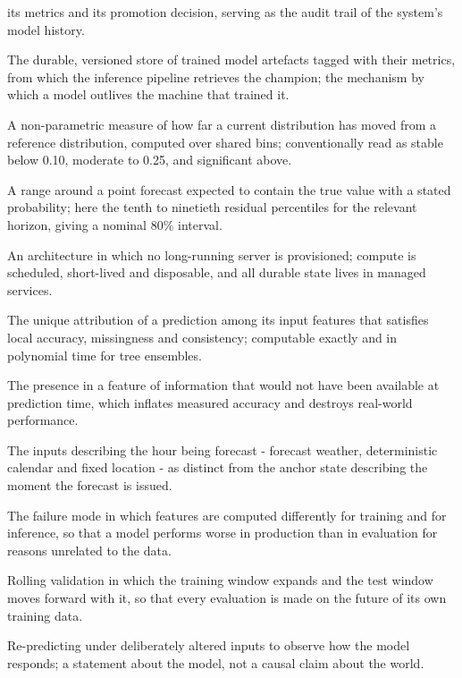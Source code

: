 \begin{description}[style=nextline,leftmargin=1.5em,labelsep=0pt,itemsep=5pt]
  its metrics and its promotion decision, serving as the audit trail of the
  system's model history.
  \item[Model registry] The durable, versioned store of trained model artefacts
  tagged with their metrics, from which the inference pipeline retrieves the
  champion; the mechanism by which a model outlives the machine that trained it.
  \item[Population Stability Index] A non-parametric measure of how far a current
  distribution has moved from a reference distribution, computed over shared bins;
  conventionally read as stable below 0.10, moderate to 0.25, and significant
  above.
  \item[Prediction interval] A range around a point forecast expected to contain
  the true value with a stated probability; here the tenth to ninetieth residual
  percentiles for the relevant horizon, giving a nominal 80\% interval.
  \item[Serverless] An architecture in which no long-running server is
  provisioned; compute is scheduled, short-lived and disposable, and all durable
  state lives in managed services.
  \item[Shapley value] The unique attribution of a prediction among its input
  features that satisfies local accuracy, missingness and consistency; computable
  exactly and in polynomial time for tree ensembles.
  \item[Target leakage] The presence in a feature of information that would not
  have been available at prediction time, which inflates measured accuracy and
  destroys real-world performance.
  \item[Target-time features] The inputs describing the hour being forecast -
  forecast weather, deterministic calendar and fixed location - as distinct from
  the anchor state describing the moment the forecast is issued.
  \item[Training-serving skew] The failure mode in which features are computed
  differently for training and for inference, so that a model performs worse in
  production than in evaluation for reasons unrelated to the data.
  \item[Walk-forward backtest] Rolling validation in which the training window
  expands and the test window moves forward with it, so that every evaluation is
  made on the future of its own training data.
  \item[What-if simulation] Re-predicting under deliberately altered inputs to
  observe how the model responds; a statement about the model, not a causal claim
  about the world.
\end{description}
